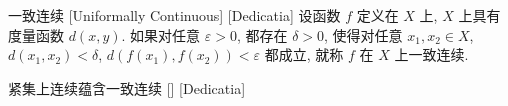 \documentclass[UTF8]{ctexart}
\newcommand{\hyperrefc}[2]{\hyperref[#1]{\textcolor{purple}{#2}}}
\begin{document}






        \begin{dfn}
            [UUID]
            {一致连续}
            [Uniformally Continuous]
            [Dedicatia]
            设函数 \(f\) 定义在 \(X\) 上,  \(X\) 上具有度量函数 \(d(x,y)\). 如果对任意 \(\varepsilon>0\), 都存在 \(\delta>0\), 使得对任意 \(x_1,x_2\in X\),  \(d(x_1,x_2)<\delta\),  \(d(f(x_1),f(x_2))<\varepsilon\) 都成立, 就称 \(f\) 在 \(X\) 上一致连续. 
        \end{dfn}

        \begin{thm}
            [UUID]
            {紧集上连续蕴含一致连续}
            []
            [Dedicatia]
        \end{thm}
\end{document}
